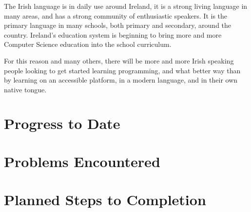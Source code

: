 \documentclass[11pt]{extarticle}
\begin{document}
    The Irish language is in daily use around Ireland, it is a strong living language in many areas, and has a strong community of enthusiastic speakers. It is the primary language in many schools, both primary and secondary, around the country. Ireland's education system is beginning to bring more and more Computer Science education into the school curriculum.
    
    For this reason and many others, there will be more and more Irish speaking people looking to get started learning programming, and what better way than by learning on an accessible platform, in a modern language, and in their own native tongue.
    \section*{Progress to Date}
    \section*{Problems Encountered}
    \section*{Planned Steps to Completion}
\end{document}
